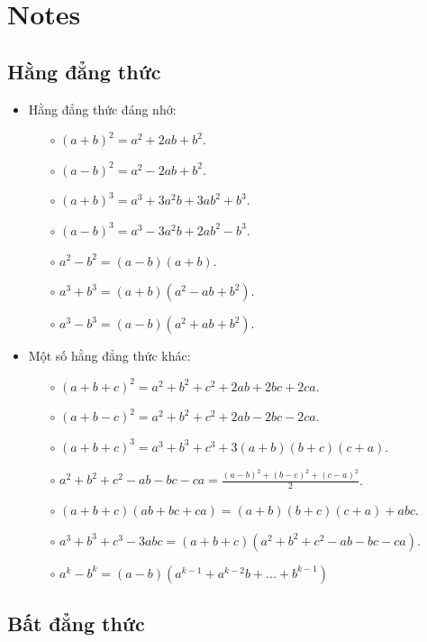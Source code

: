 \section{Notes}
\subsection{Hằng đẳng thức}

\begin{itemize}
	\item Hằng đẳng thức đáng nhớ:
	\begin{itemize}
		\item[$\circ$] $(a + b)^2 = a^2 + 2ab + b^2$.
		\item[$\circ$] $(a - b)^2 = a^2 - 2ab + b^2$.
		\item[$\circ$] $(a + b)^3 = a^3 + 3a^2b + 3ab^2 + b^3$.
		\item[$\circ$] $(a - b)^3 = a^3 - 3a^2b + 2ab^2 - b^3$.
		\item[$\circ$] $a^2 - b^2 = (a - b)(a + b)$.
		\item[$\circ$] $a^3 + b^3 = (a + b)(a^2 - ab + b^2)$.
		\item[$\circ$] $a^3 - b^3 = (a - b)(a^2 + ab + b^2)$.
	\end{itemize}
	\item Một số hằng đẳng thức khác:
	\begin{itemize}
		\item[$\circ$] $(a + b + c)^2 = a^2 + b^2 + c^2 + 2ab + 2bc + 2ca$.
		\item[$\circ$] $(a + b - c)^2 = a^2 + b^2 + c^2 + 2ab - 2bc - 2ca$.
		\item[$\circ$] $(a + b + c)^3 = a^3 + b^3 + c^3 + 3(a + b)(b + c)(c + a)$.
		\item[$\circ$] $\displaystyle a^2 + b^2 + c^2 - ab - bc - ca = \frac{(a - b)^2 + (b - c)^2 + (c - a)^2}{2}$.
		\item[$\circ$] $(a + b + c)(ab + bc + ca) = (a + b)(b + c)(c + a) + abc$.
		\item[$\circ$] $a^3 + b^3 + c^3 - 3abc = (a + b + c)(a^2 + b^2 + c^2 - ab - bc - ca)$.
		\item[$\circ$] $a^k - b^k = (a - b)(a^{k - 1} + a^{k - 2}b + ... + b^{k - 1})$
	\end{itemize}
\end{itemize}


\pagebreak
\subsection{Bất đẳng thức}
